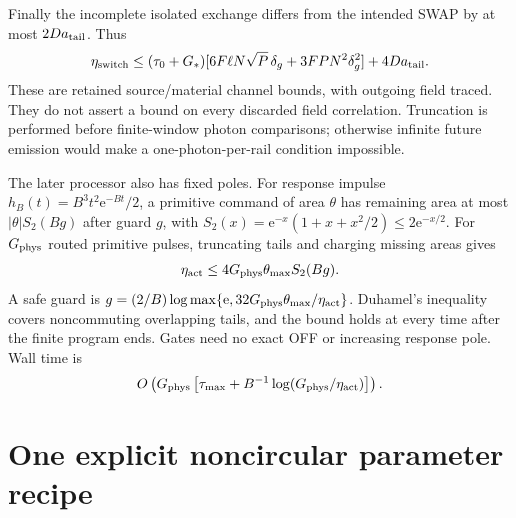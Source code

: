 \documentclass[11pt,a4paper]{article}
\newcommand{\ee}{\mathrm e}
\begin{document}
Finally the incomplete isolated exchange differs from the intended SWAP by at most $2D a_{\rm tail}$. Thus
\begin{equation}
 \eta_{\rm switch}\le
 (\tau_0+G_*)[6F\ell N\sqrt P\,\delta_g+3FPN^2\delta_g^2]
 +4D a_{\rm tail}.
 \label{eq:switchbudget}
\end{equation}
These are retained source/material channel bounds, with outgoing field traced. They do not assert a bound on every discarded field correlation. Truncation is performed before finite-window photon comparisons; otherwise infinite future emission would make a one-photon-per-rail condition impossible.

The later processor also has fixed poles. For response impulse $h_B(t)=B^3t^2\ee^{-Bt}/2$, a primitive command of area $\theta$ has remaining area at most $|\theta|S_2(Bg)$ after guard $g$, with $S_2(x)=\ee^{-x}(1+x+x^2/2)\le2\ee^{-x/2}$. For $G_{\rm phys}$ routed primitive pulses, truncating tails and charging missing areas gives
\begin{equation}
 \eta_{\rm act}\le4G_{\rm phys}\theta_{\max}S_2(Bg).
\end{equation}
A safe guard is $g=(2/B)\log\max\{\ee,32G_{\rm phys}\theta_{\max}/\eta_{\rm act}\}$. Duhamel's inequality covers noncommuting overlapping tails, and the bound holds at every time after the finite program ends. Gates need no exact OFF or increasing response pole. Wall time is
\begin{equation}
 O\left(G_{\rm phys}\left[\tau_{\max}+B^{-1}\log(G_{\rm phys}/\eta_{\rm act})\right]\right).
 \label{eq:gateclock}
\end{equation}

\section{One explicit noncircular parameter recipe}
\label{sec:recipe}
\end{document}

